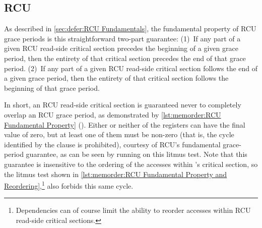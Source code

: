 



\subsection{RCU}
\label{sec:memorder:RCU}

As described in
\cref{sec:defer:RCU Fundamentals},
the fundamental property of RCU grace periods is this straightforward
two-part guarantee:
(1)~If any part of a given RCU read-side critical section precedes
the beginning of a given grace period, then the entirety of that
critical section precedes the end of that grace period.
(2)~If any part of a given RCU read-side critical section follows
the end of a given grace period, then the entirety of that
critical section follows the beginning of that grace period.

\begin{listing}[tb]

\caption{RCU Fundamental Property}
\label{lst:memorder:RCU Fundamental Property}
\end{listing}

\begin{listing}[tb]

\caption{RCU Fundamental Property and Reordering}
\label{lst:memorder:RCU Fundamental Property and Reordering}
\end{listing}

In short, an RCU read-side critical section is guaranteed never to
completely overlap an RCU grace period, as demonstrated by
\cref{lst:memorder:RCU Fundamental Property}
().
Either or neither of the  registers can have the final value of zero,
but at least one of them must be non-zero (that is, the cycle identified
by the  clause is prohibited), courtesy of RCU's fundamental
grace-period guarantee, as can be seen by running  on this litmus test.
Note that this guarantee is insensitive to the ordering of the accesses
within 's critical section, so the litmus test shown in
\cref{lst:memorder:RCU Fundamental Property and Reordering},\footnote{
	Dependencies can of course limit the ability to reorder accesses
	within RCU read-side critical sections.}
also forbids this same cycle.

